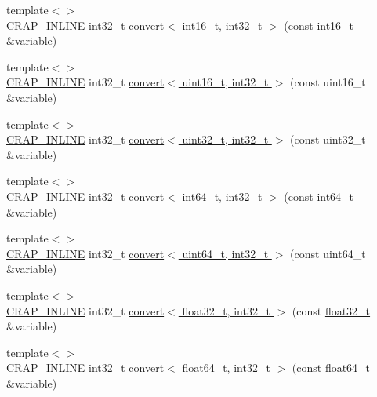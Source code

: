 \begin{DoxyCompactItemize}
\item 
{\footnotesize template$<$$>$ }\\\hyperlink{config__x86_8h_a5a40526b8d842e7ff731509998bb0f1c}{C\+R\+A\+P\+\_\+\+I\+N\+L\+I\+N\+E} int32\+\_\+t \hyperlink{namespacecrap_a2e7636cbe7537299424658e1a343d43e}{convert$<$ int16\+\_\+t, int32\+\_\+t $>$} (const int16\+\_\+t \&variable)
\item 
{\footnotesize template$<$$>$ }\\\hyperlink{config__x86_8h_a5a40526b8d842e7ff731509998bb0f1c}{C\+R\+A\+P\+\_\+\+I\+N\+L\+I\+N\+E} int32\+\_\+t \hyperlink{namespacecrap_a559a2c690502997be081496b58a3d3ac}{convert$<$ uint16\+\_\+t, int32\+\_\+t $>$} (const uint16\+\_\+t \&variable)
\item 
{\footnotesize template$<$$>$ }\\\hyperlink{config__x86_8h_a5a40526b8d842e7ff731509998bb0f1c}{C\+R\+A\+P\+\_\+\+I\+N\+L\+I\+N\+E} int32\+\_\+t \hyperlink{namespacecrap_a0dc939761075d09d9212ba3aae3fa193}{convert$<$ uint32\+\_\+t, int32\+\_\+t $>$} (const uint32\+\_\+t \&variable)
\item 
{\footnotesize template$<$$>$ }\\\hyperlink{config__x86_8h_a5a40526b8d842e7ff731509998bb0f1c}{C\+R\+A\+P\+\_\+\+I\+N\+L\+I\+N\+E} int32\+\_\+t \hyperlink{namespacecrap_aed465f067917131b48e7cf94916c8674}{convert$<$ int64\+\_\+t, int32\+\_\+t $>$} (const int64\+\_\+t \&variable)
\item 
{\footnotesize template$<$$>$ }\\\hyperlink{config__x86_8h_a5a40526b8d842e7ff731509998bb0f1c}{C\+R\+A\+P\+\_\+\+I\+N\+L\+I\+N\+E} int32\+\_\+t \hyperlink{namespacecrap_a743392dae0ed95923b160d130cea5251}{convert$<$ uint64\+\_\+t, int32\+\_\+t $>$} (const uint64\+\_\+t \&variable)
\item 
{\footnotesize template$<$$>$ }\\\hyperlink{config__x86_8h_a5a40526b8d842e7ff731509998bb0f1c}{C\+R\+A\+P\+\_\+\+I\+N\+L\+I\+N\+E} int32\+\_\+t \hyperlink{namespacecrap_a045a6994e54aa69045f37e6e4411fff2}{convert$<$ float32\+\_\+t, int32\+\_\+t $>$} (const \hyperlink{crap__types_8h_a4611b605e45ab401f02cab15c5e38715}{float32\+\_\+t} \&variable)
\item 
{\footnotesize template$<$$>$ }\\\hyperlink{config__x86_8h_a5a40526b8d842e7ff731509998bb0f1c}{C\+R\+A\+P\+\_\+\+I\+N\+L\+I\+N\+E} int32\+\_\+t \hyperlink{namespacecrap_aa358f7da86c4d07bc8a6bee447427fa2}{convert$<$ float64\+\_\+t, int32\+\_\+t $>$} (const \hyperlink{crap__types_8h_ac55f3ae81b5bc9053760baacf57e47f4}{float64\+\_\+t} \&variable)

\end{DoxyCompactItemize}
